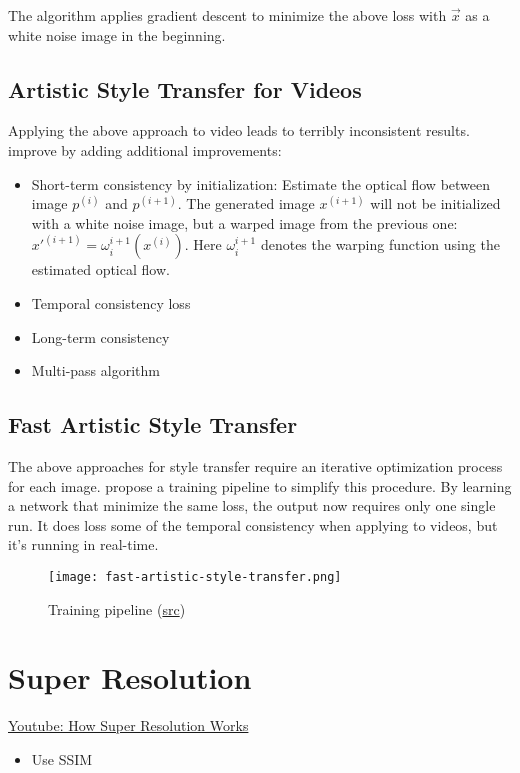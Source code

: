 The algorithm applies gradient descent to minimize the above loss with $\vec{x}$ as a white noise image in the beginning.

\subsection{Artistic Style Transfer for Videos}
Applying the above approach to video leads to terribly inconsistent results.  improve by adding additional improvements:
\begin{itemize}
	\item Short-term consistency by initialization: Estimate the optical flow between image $p^{(i)}$ and $p^{(i+1)}$. The generated image $x^{(i+1)}$ will not be initialized with a white noise image, but a warped image from the previous one: $x'^{(i+1)} = \omega_i^{i+1} (x^{(i)})$. Here $\omega_i^{i+1}$ denotes the warping function using the estimated optical flow.
	\item Temporal consistency loss
	\item Long-term consistency
	\item Multi-pass algorithm
\end{itemize}

\subsection{Fast Artistic Style Transfer}
The above approaches for style transfer require an iterative optimization process for each image.  propose a training pipeline to simplify this procedure. By learning a network that minimize the same loss, the output now requires only one single run. It does loss some of the temporal consistency when applying to videos, but it's running in real-time.
\begin{figure}[hbt!]
	\centering
	\texttt{[image: fast-artistic-style-transfer.png]}
	\caption{Training pipeline (\href{https://youtu.be/VQEMptfWpLk}{src}) \cite{johnson2016perceptual}}
\end{figure}

\section{Super Resolution}
\href{https://youtu.be/KULkSwLk62I}{Youtube: How Super Resolution Works}
\begin{itemize}
	\item Use \ac{SSIM} \cite{wang2009mean, wang2004image}
\end{itemize}
